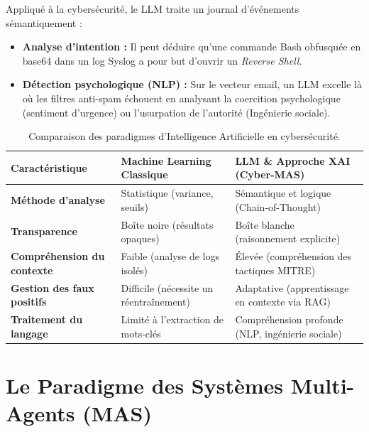 \documentclass[a4paper, 12pt]{report}
\begin{document}
Appliqué à la cybersécurité, le LLM traite un journal d'événements sémantiquement :
\begin{itemize}
    \item \textbf{Analyse d'intention :} Il peut déduire qu'une commande Bash obfusquée en base64 dans un log Syslog a pour but d'ouvrir un \textit{Reverse Shell}.
    \item \textbf{Détection psychologique (NLP) :} Sur le vecteur email, un LLM excelle là où les filtres anti-spam échouent en analysant la coercition psychologique (sentiment d'urgence) ou l'usurpation de l'autorité (Ingénierie sociale).
\end{itemize}

\begin{table}[htbp]
\centering
\caption[Comparaison des paradigmes d'Intelligence Artificielle en cybersécurité]{Comparaison des paradigmes d'Intelligence Artificielle en cybersécurité.}
\label{tab:comparaison_ia}
\vspace{0.2cm}
\begin{tabular}{|>{\raggedright\arraybackslash}p{3.5cm}|>{\raggedright\arraybackslash}p{5cm}|>{\raggedright\arraybackslash}p{5.5cm}|}
\hline
\textbf{Caractéristique} & \textbf{Machine Learning Classique} & \textbf{LLM \& Approche XAI (Cyber-MAS)} \\ \hline
\textbf{Méthode d'analyse} & Statistique (variance, seuils) & Sémantique et logique (Chain-of-Thought) \\ \hline
\textbf{Transparence} & Boîte noire (résultats opaques) & Boîte blanche (raisonnement explicite) \\ \hline
\textbf{Compréhension du contexte} & Faible (analyse de logs isolés) & Élevée (compréhension des tactiques MITRE) \\ \hline
\textbf{Gestion des faux positifs} & Difficile (nécessite un réentraînement) & Adaptative (apprentissage en contexte via RAG) \\ \hline
\textbf{Traitement du langage} & Limité à l'extraction de mots-clés & Compréhension profonde (NLP, ingénierie sociale) \\ \hline
\end{tabular}
\end{table}

\section{Le Paradigme des Systèmes Multi-Agents (MAS)}
\label{sec:mas_theorie}
\end{document}
